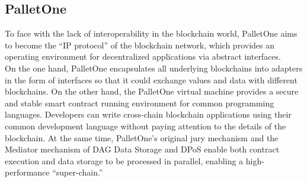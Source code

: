 










\subsection{PalletOne}
\noindent To face with the lack of interoperability in the blockchain world, PalletOne aims to become the ``IP protocol'' of the blockchain network, which provides an operating environment for decentralized applications via abstract interfaces.\cite{palletone} \\

\noindent On the one hand, PalletOne encapsulates all underlying blockchains into adapters in the form of interfaces so that it could exchange values and data with different blockchains. On the other hand, the PalletOne virtual machine provides a secure and stable smart contract running environment for common programming languages. Developers can write cross-chain blockchain applications using their common development language without paying attention to the details of the blockchain. At the same time, PalletOne's original jury mechanism and the Mediator mechanism of DAG Data Storage and DPoS enable both contract execution and data storage to be processed in parallel, enabling a high-performance ``super-chain.''\\

